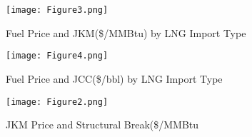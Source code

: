 \documentclass[12pt]{article}
\begin{document}
\begin{figure}[htbp] 
    \centering
            \caption{Fuel Price and JKM(\$/MMBtu) by LNG Import Type}
        \texttt{[image: Figure3.png]}
        \label{fig:88mono}
\end{figure}




\begin{figure}[htbp] 
    \centering
            \caption{Fuel Price and JCC(\$/bbl) by LNG Import Type}
        \texttt{[image: Figure4.png]}
        \label{fig:88mono}
\end{figure}









\begin{figure}[htbp] 
    \centering
            \caption{JKM Price and Structural Break(\$/MMBtu}
        \texttt{[image: Figure2.png]}
        \label{fig:88mono}
\end{figure}
\end{document}
